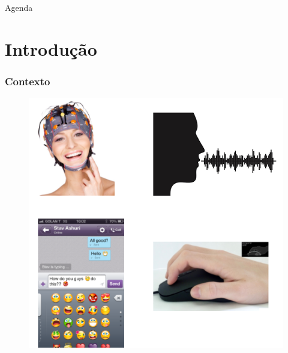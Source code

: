 \documentclass{beamer}
\date{Manaus, 30 de Julho de 2018}
\begin{document}
\begin{frame}
 \maketitle
\end{frame}

\begin{frame}{Agenda}
  \tableofcontents
\end{frame}

\section{Introdução}

\begin{frame}
\frametitle{Contexto}
\begin{figure}
\centering
\includegraphics[scale=0.39]{figuras/contexto_1.png}
\label{fig:problema1}
\end{figure}
\end{frame}
\end{document}
